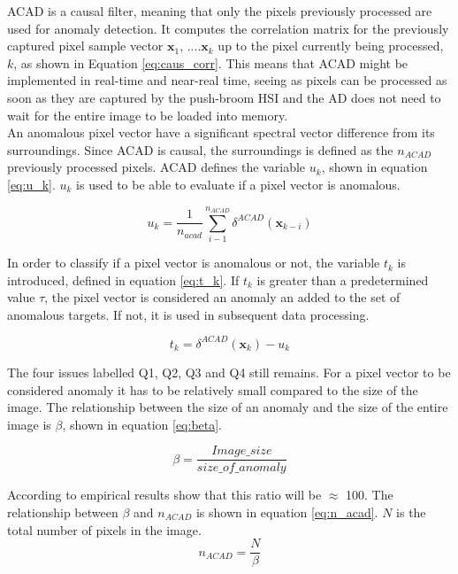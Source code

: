 ACAD is a causal filter, meaning that only the pixels previously processed are used for anomaly detection.  It computes the correlation matrix for the previously captured pixel sample vector {$\textbf{x}_1$, ....$\textbf{x}_k$} up to the pixel currently being processed, $k$, as shown in Equation \ref{eq:caus_corr}. This means that ACAD might be implemented in real-time and near-real time, seeing as pixels can be processed as soon as they are captured by the push-broom HSI and the AD does not need to wait for the entire image to be loaded into memory. \\

An anomalous pixel vector have a significant spectral vector difference from its surroundings. Since ACAD is causal, the surroundings is defined as the $n_{ACAD}$ previously processed pixels. %
ACAD defines the variable $u_k$, shown in equation \ref{eq:u_k}. $u_k$ is used to be able to evaluate if a pixel vector is anomalous. 

\begin{equation}
    u_k = \frac{1}{n_{acad}}\sum_{i-1}^{n_{ACAD}}  \delta^{ACAD}(\textbf{x}_{k-i})
    \label{eq:u_k}
\end{equation}

In order to classify if a pixel vector is anomalous or not, the variable $t_k$ is introduced, defined in equation \ref{eq:t_k}. If $t_k$ is greater than a predetermined value $\tau$, the pixel vector is considered an anomaly an added to the set of anomalous targets. If not, it is used in subsequent data processing. 

\begin{equation}
    t_k = \delta^{ACAD}(\textbf{x}_{k}) - u_k
    \label{eq:t_k}
\end{equation}


The four issues labelled Q1, Q2, Q3 and Q4 still remains. For a pixel vector to be considered anomaly it has to be relatively small compared to the size of the image. The relationship between the size of an anomaly and the size of the entire image is $\beta$, shown in equation \ref{eq:beta}.

\begin{equation}
    \beta  = \frac{Image\_size}{size\_of\_anomaly}
    \label{eq:beta}
\end{equation}

According to \cite{chang2006characterization} empirical results show that this ratio will be $\approx$ 100.
The relationship between $\beta$ and $n_{ACAD}$ is shown in equation \ref{eq:n_acad}. $N$ is the total number of pixels in the image. 
\begin{equation}
    n_{ACAD} = \frac{N}{\beta}
    \label{eq:n_acad}
\end{equation}

